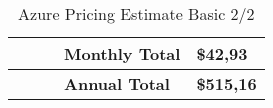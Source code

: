\begin{landscape}
\begin{table}[]
\begin{tabularx}{\linewidth}{|l|X|X|X|X|}
                                        &                           &                 & \textbf{Monthly Total}                                                                                                                                                                                                                           & \textbf{\$42,93}                         \\ \hline
                                        &                           &                 & \textbf{Annual Total}                                                                                                                                                                                                                            & \textbf{\$515,16}                        \\ \hline
                                            \end{tabularx}
                                            \caption{Azure Pricing Estimate Basic 2/2}
                                            \label{tab:azPriceT1_2}
                                            \end{table}
                                            \end{landscape}